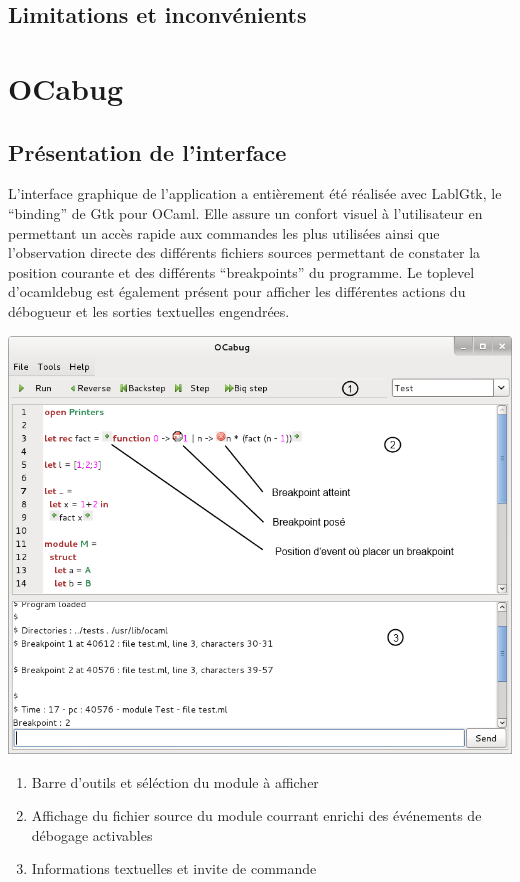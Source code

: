 \documentclass[11pt,a4paper]{report}
\begin{document}
\section{Limitations et inconvénients} %


\chapter{OCabug}



\section{Présentation de l'interface}

L'interface graphique de l'application a entièrement été réalisée avec LablGtk, le ``binding'' de Gtk pour OCaml.
Elle assure un confort visuel à l'utilisateur en permettant un accès rapide aux commandes les plus utilisées ainsi
que l'observation directe des différents fichiers sources permettant de constater la position courante 
et des différents ``breakpoints'' du programme. Le toplevel d'ocamldebug est également présent pour afficher
les différentes actions du débogueur et les sorties textuelles engendrées.

\includegraphics{screen_exec}

\begin{enumerate}
\item Barre d'outils et séléction du module à afficher
\item Affichage du fichier source du module courrant enrichi des événements de débogage activables
\item Informations textuelles et invite de commande
\end{enumerate}
\end{document}

